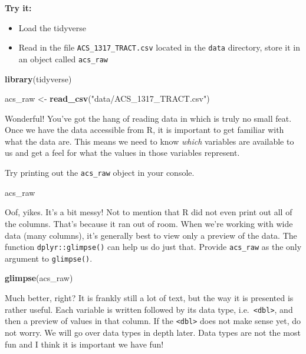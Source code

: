 \documentclass[
]{book}
\newenvironment{Shaded}{\begin{snugshade}}{\end{snugshade}}
\newcommand{\KeywordTok}[1]{\textcolor[rgb]{0.13,0.29,0.53}{\textbf{#1}}}
\newcommand{\NormalTok}[1]{#1}
\newcommand{\StringTok}[1]{\textcolor[rgb]{0.31,0.60,0.02}{#1}}
\providecommand{\tightlist}{%
  \setlength{\itemsep}{0pt}\setlength{\parskip}{0pt}}
\begin{document}
\textbf{Try it:}

\begin{itemize}
\tightlist
\item
  Load the tidyverse
\item
  Read in the file \texttt{ACS\_1317\_TRACT.csv} located in the \texttt{data} directory, store it in an object called \texttt{acs\_raw}
\end{itemize}

\begin{Shaded}
\begin{Highlighting}[]
\KeywordTok{library}\NormalTok{(tidyverse)}

\NormalTok{acs\_raw \textless{}{-}}\StringTok{ }\KeywordTok{read\_csv}\NormalTok{(}\StringTok{"data/ACS\_1317\_TRACT.csv"}\NormalTok{)}
\end{Highlighting}
\end{Shaded}

Wonderful! You've got the hang of reading data in which is truly no small feat. Once we have the data accessible from R, it is important to get familiar with what the data are. This means we need to know \emph{which} variables are available to us and get a feel for what the values in those variables represent.

Try printing out the \texttt{acs\_raw} object in your console.

\begin{Shaded}
\begin{Highlighting}[]
\NormalTok{acs\_raw}
\end{Highlighting}
\end{Shaded}

Oof, yikes. It's a bit messy! Not to mention that R did not even print out all of the columns. That's because it ran out of room. When we're working with wide data (many columns), it's generally best to view only a preview of the data. The function \texttt{dplyr::glimpse()} can help us do just that. Provide \texttt{acs\_raw} as the only argument to \texttt{glimpse()}.

\begin{Shaded}
\begin{Highlighting}[]
\KeywordTok{glimpse}\NormalTok{(acs\_raw)}
\end{Highlighting}
\end{Shaded}

Much better, right? It is frankly still a lot of text, but the way it is presented is rather useful. Each variable is written followed by its data type, i.e.~\texttt{\textless{}dbl\textgreater{}}, and then a preview of values in that column. If the \texttt{\textless{}dbl\textgreater{}} does not make sense yet, do not worry. We will go over data types in depth later. Data types are not the most fun and I think it is important we have fun!
\end{document}

